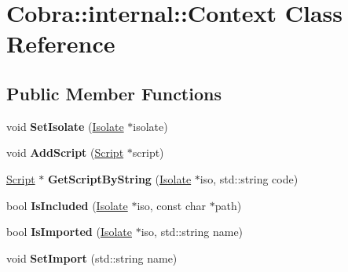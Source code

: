 \hypertarget{class_cobra_1_1internal_1_1_context}{\section{Cobra\+:\+:internal\+:\+:Context Class Reference}
\label{class_cobra_1_1internal_1_1_context}
}
\subsection*{Public Member Functions}
\begin{DoxyCompactItemize}
\item 
\hypertarget{class_cobra_1_1internal_1_1_context_a9ce99f725452c20315f88c9fb0328baa}{void {\bfseries Set\+Isolate} (\hyperlink{class_cobra_1_1internal_1_1_isolate}{Isolate} $\ast$isolate)}\label{class_cobra_1_1internal_1_1_context_a9ce99f725452c20315f88c9fb0328baa}

\item 
\hypertarget{class_cobra_1_1internal_1_1_context_a077c432927bd36374978cf56c55b58e2}{void {\bfseries Add\+Script} (\hyperlink{class_cobra_1_1internal_1_1_script}{Script} $\ast$script)}\label{class_cobra_1_1internal_1_1_context_a077c432927bd36374978cf56c55b58e2}

\item 
\hypertarget{class_cobra_1_1internal_1_1_context_a9128b4d12daae36ec57607d9d7867f6c}{\hyperlink{class_cobra_1_1internal_1_1_script}{Script} $\ast$ {\bfseries Get\+Script\+By\+String} (\hyperlink{class_cobra_1_1internal_1_1_isolate}{Isolate} $\ast$iso, std\+::string code)}\label{class_cobra_1_1internal_1_1_context_a9128b4d12daae36ec57607d9d7867f6c}

\item 
\hypertarget{class_cobra_1_1internal_1_1_context_a2309f31e215ee3278600c9b057fc7317}{bool {\bfseries Is\+Included} (\hyperlink{class_cobra_1_1internal_1_1_isolate}{Isolate} $\ast$iso, const char $\ast$path)}\label{class_cobra_1_1internal_1_1_context_a2309f31e215ee3278600c9b057fc7317}

\item 
\hypertarget{class_cobra_1_1internal_1_1_context_a6392369b035385205d537719d3ebea22}{bool {\bfseries Is\+Imported} (\hyperlink{class_cobra_1_1internal_1_1_isolate}{Isolate} $\ast$iso, std\+::string name)}\label{class_cobra_1_1internal_1_1_context_a6392369b035385205d537719d3ebea22}

\item 
\hypertarget{class_cobra_1_1internal_1_1_context_ac604a6bd9357f93c0d3e49b725305350}{void {\bfseries Set\+Import} (std\+::string name)}\label{class_cobra_1_1internal_1_1_context_ac604a6bd9357f93c0d3e49b725305350}


\end{DoxyCompactItemize}

